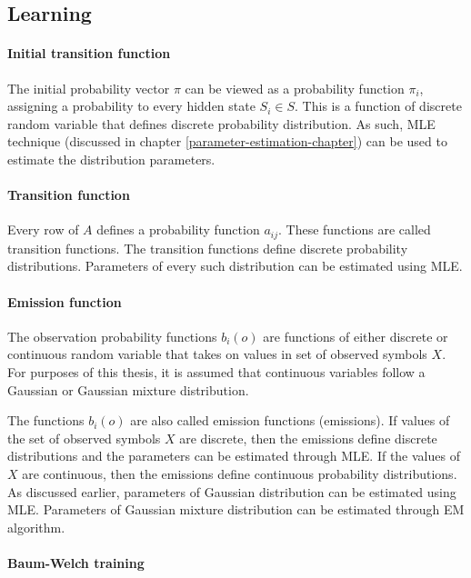 \documentclass[thesis=B,english]{FITthesis}[2012/06/26]
\begin{document}
\subsection{Learning}

\paragraph{Initial transition function}

The initial probability vector $\pi$ can be viewed as a probability function $\pi_i$, assigning a probability to every hidden state $S_i \in S$. This is a function of discrete random variable that defines discrete probability distribution. As such, MLE technique (discussed in chapter \ref{parameter-estimation-chapter}) can be used to estimate the distribution parameters.

\paragraph{Transition function}

Every row of $A$ defines a probability function $a_{ij}$. These functions are called transition functions. The transition functions define discrete probability distributions. Parameters of every such distribution can be estimated using MLE.

\paragraph{Emission function}

The observation probability functions $b_i(o)$ are functions of either discrete or continuous random variable that takes on values in set of observed symbols $X$. For purposes of this thesis, it is assumed that continuous variables follow a Gaussian or Gaussian mixture distribution.

The functions $b_i(o)$ are also called emission functions (emissions). If values of the set of observed symbols $X$ are discrete, then the emissions define discrete distributions and the parameters can be estimated through MLE. If the values of $X$ are continuous, then the emissions define continuous probability distributions. As discussed earlier, parameters of Gaussian distribution can be estimated using MLE. Parameters of Gaussian mixture distribution can be estimated through EM algorithm.

\paragraph{Baum-Welch training}
\end{document}
